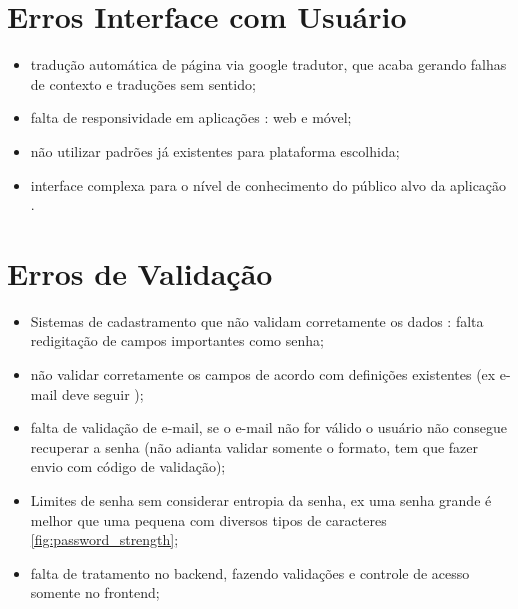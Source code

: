 \section{Erros Interface com Usuário}

\begin{itemize}
    \item tradução automática de página via google tradutor, que acaba gerando falhas de contexto e traduções sem sentido;
    
    \item falta de responsividade em aplicações : web e móvel;
    
    \item não utilizar padrões já existentes para plataforma escolhida;
    
    \item interface complexa para o nível de conhecimento do público alvo da aplicação
    \newline
    \cite{computer_skills}.
    
\end{itemize}

\section{Erros de Validação}

\begin{itemize}
    \item Sistemas de cadastramento que não validam corretamente os dados : falta redigitação de campos importantes como senha;
    
    \item não validar corretamente os campos de acordo com definições existentes (ex e-mail deve seguir );
    
    \item falta de validação de e-mail, se o e-mail não for válido o usuário não consegue recuperar a senha (não adianta validar somente o formato, tem que fazer envio com código de validação);
    
    \item Limites de senha sem considerar entropia da senha, ex uma senha grande é melhor que uma pequena com diversos tipos de caracteres \autoref{fig:password_strength};

    \item falta de tratamento no backend, fazendo validações e controle de acesso somente no frontend;
    
\end{itemize}

